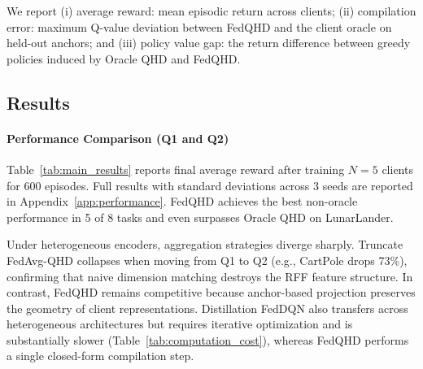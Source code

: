 \documentclass[sigconf,anonymous]{aamas}
\theoremstyle{plain}
\theoremstyle{definition}
\theoremstyle{remark}
\begin{document}
We report (i) average reward: mean episodic return across
clients; (ii) compilation error: maximum Q-value deviation
between FedQHD and the client oracle on held-out anchors; and
(iii) policy value gap: the return difference between greedy
policies induced by Oracle QHD and FedQHD.


\subsection{Results}
\label{sec:results}

\paragraph{Performance Comparison (Q1 and Q2)}
\label{subsec:performance_homo}

Table~\ref{tab:main_results} reports final average reward after training
$N=5$ clients for 600 episodes. Full results with standard deviations across 3 seeds are reported in Appendix~\ref{app:performance}. FedQHD achieves the best non-oracle
performance in 5 of 8 tasks and even surpasses Oracle QHD on
LunarLander.


Under heterogeneous encoders, aggregation strategies diverge sharply.
Truncate FedAvg-QHD collapses when moving from Q1 to Q2 (e.g.,
CartPole drops 73\%), confirming that naive dimension matching
destroys the RFF feature structure. In contrast, FedQHD remains
competitive because anchor-based projection preserves the geometry
of client representations. Distillation FedDQN also transfers across
heterogeneous architectures but requires iterative optimization and
is substantially slower (Table~\ref{tab:computation_cost}), whereas
FedQHD performs a single closed-form compilation step.
\end{document}
